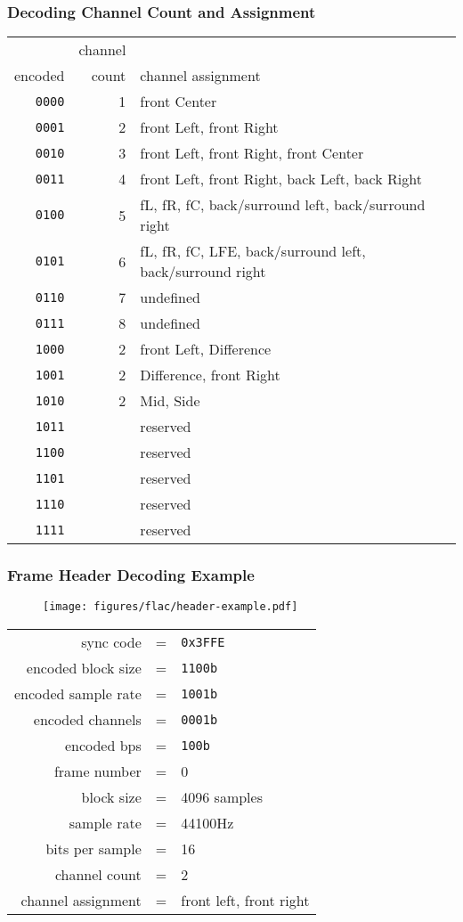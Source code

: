\subsubsection{Decoding Channel Count and Assignment}
{
\begin{tabular}{rrl}
& channel & \\
encoded & count & channel assignment \\
\hline
\texttt{0000} & 1 & front Center \\
\texttt{0001} & 2 & front Left, front Right \\
\texttt{0010} & 3 & front Left, front Right, front Center \\
\texttt{0011} & 4 & front Left, front Right, back Left, back Right \\
\texttt{0100} & 5 & fL, fR, fC, back/surround left, back/surround right \\
\texttt{0101} & 6 & fL, fR, fC, LFE, back/surround left, back/surround right \\
\texttt{0110} & 7 & undefined \\
\texttt{0111} & 8 & undefined \\
\texttt{1000} & 2 & front Left, Difference \\
\texttt{1001} & 2 & Difference, front Right \\
\texttt{1010} & 2 & Mid, Side \\
\texttt{1011} & & reserved \\
\texttt{1100} & & reserved \\
\texttt{1101} & & reserved \\
\texttt{1110} & & reserved \\
\texttt{1111} & & reserved \\
\end{tabular}
}

\subsubsection{Frame Header Decoding Example}
\begin{figure}[h]
\texttt{[image: figures/flac/header-example.pdf]}
\end{figure}
{
\begin{tabular}{rcl}
\textsf{sync code} & = & \texttt{0x3FFE} \\
\textsf{encoded block size} & = & \texttt{1100b} \\
\textsf{encoded sample rate} & = & \texttt{1001b} \\
\textsf{encoded channels} & = & \texttt{0001b} \\
\textsf{encoded bps} & = & \texttt{100b} \\
\textsf{frame number} & = & 0 \\
\textsf{block size} & = & 4096 samples \\
\textsf{sample rate} & = & 44100Hz \\
\textsf{bits per sample} & = & 16 \\
\textsf{channel count} & = & 2 \\
\textsf{channel assignment} & = & front left, front right
\end{tabular}
}

